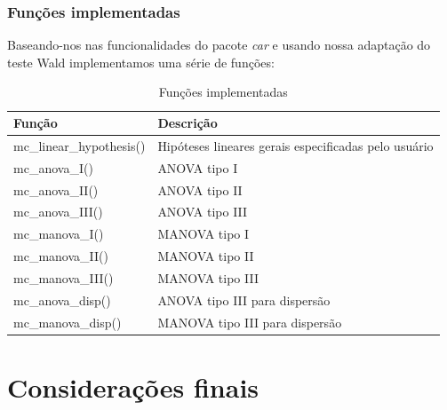 \documentclass[10pt,
  aspectratio=169,
  serif,
  mathserif,
  professionalfont,
  compress,
  handout,
  ]{beamer}\usepackage[]{graphicx}\usepackage[]{color}
\begin{document}
\begin{frame}
  \frametitle{Funções implementadas}

Baseando-nos nas funcionalidades do pacote \emph{car} \cite{car} e usando nossa adaptação do teste Wald implementamos uma série de funções:


\begin{table}[h]
\centering
\begin{tabular}{ll}
\hline
Função                   & Descrição \\ 
\hline

mc\_linear\_hypothesis() & Hipóteses lineares gerais especificadas pelo usuário \\

mc\_anova\_I()           & ANOVA  tipo I \\
mc\_anova\_II()          & ANOVA  tipo II \\
mc\_anova\_III()         & ANOVA  tipo III \\

mc\_manova\_I()          & MANOVA tipo I \\
mc\_manova\_II()         & MANOVA tipo II \\
mc\_manova\_III()        & MANOVA tipo III \\

mc\_anova\_disp()        & ANOVA  tipo III para dispersão \\
mc\_manova\_disp()       & MANOVA tipo III para dispersão \\

\hline
\end{tabular}
\caption{Funções implementadas}
\label{tab:funcoes}
\end{table}

\end{frame}


\section{Considerações finais}

\end{document}
